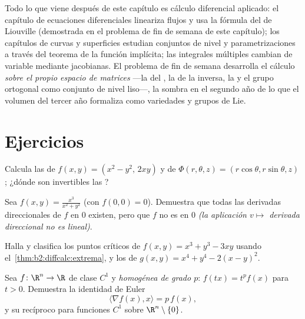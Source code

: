 \begin{remark}
Todo lo que viene después de este capítulo es cálculo diferencial
aplicado: el capítulo de ecuaciones diferenciales lineariza flujos y
usa la fórmula del  de Liouville (demostrada en el
problema de fin de semana de este capítulo); los capítulos de curvas
y superficies estudian conjuntos de nivel y parametrizaciones a
través del teorema de la función implícita; las integrales múltiples
cambian de variable mediante jacobianas. El problema de fin de semana
desarrolla el cálculo \emph{sobre el propio espacio de matrices}
---la  del , la de la inversa, la
 y el grupo ortogonal como conjunto de nivel
liso---, la sombra en el segundo año de lo que el volumen del tercer
año formaliza como variedades y grupos de Lie.
\end{remark}

\section{Ejercicios}

\begin{exercise}[$\star$]\label{exo:b2:diffcalc:1}
Calcula las  de $f(x,y) = (x^2 - y^2,\, 2xy)$ y de
$\Phi(r,\theta,z) = (r\cos\theta, r\sin\theta, z)$; ¿dónde son
invertibles las ?
\end{exercise}

\begin{exercise}[$\star$]\label{exo:b2:diffcalc:2}
Sea $f(x,y) = \frac{x^3}{x^2 + y^2}$ (con $f(0,0) = 0$). Demuestra
que todas las derivadas direccionales de $f$ en $0$ existen, pero que
$f$ no es  en $0$ \emph{(la aplicación $v \mapsto$
derivada direccional no es lineal)}.
\end{exercise}

\begin{exercise}[$\star$]\label{exo:b2:diffcalc:3}
Halla y clasifica los puntos críticos de $f(x, y) = x^3 + y^3 - 3xy$
usando el~\cref{thm:b2:diffcalc:extrema}, y los de $g(x,y) = x^4 +
y^4 - 2(x - y)^2$.
\end{exercise}

\begin{exercise}[$\star\star$]\label{exo:b2:diffcalc:4}
Sea $f \colon \R^n \to \R$ de clase $C^1$ y \emph{homogénea de grado
$p$}: $f(tx) = t^pf(x)$ para $t > 0$. Demuestra la identidad de Euler
\[
\langle \nabla f(x), x\rangle = p\,f(x) ,
\]
y su recíproco para funciones $C^1$ sobre $\R^n\setminus\{0\}$.
\end{exercise}

